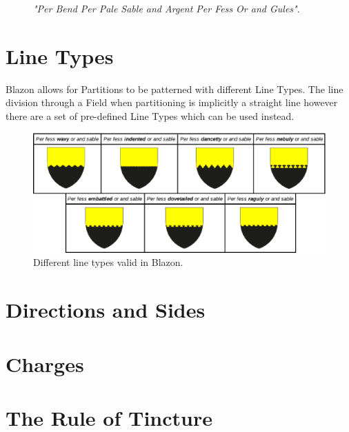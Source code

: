 \begin{figure}[H]
\hfill
\caption{\emph{"Per Bend Per Pale Sable and Argent Per Fess Or and Gules"}.}
\end{figure}

\section{Line Types}

Blazon allows for Partitions to be patterned with different Line Types.  The line division through a Field when partitioning is implicitly a straight line however there are a set of pre-defined Line Types which can be used instead.  

\begin{figure}[H]
  \centering
    \includegraphics[width=\textwidth]{blazon/images/linetypes.eps}
  \caption{Different line types valid in Blazon.\cite{linetypes}}
  
\end{figure}



\section{Directions and Sides}

\section{Charges}

\section{The Rule of Tincture}





